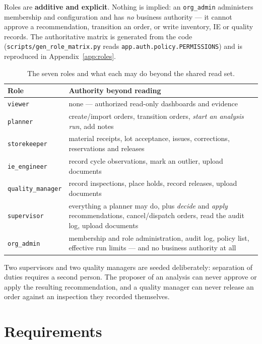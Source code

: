 \documentclass[11pt,a4paper]{article}
\begin{document}
Roles are \textbf{additive and explicit}. Nothing is implied: an
\texttt{org\_admin} administers membership and configuration and has \emph{no}
business authority --- it cannot approve a recommendation, transition an order,
or write inventory, IE or quality records. The authoritative matrix is generated
from the code (\texttt{scripts/gen\_role\_matrix.py} reads
\texttt{app.auth.policy.PERMISSIONS}) and is reproduced in
Appendix~\ref{app:roles}.

\begin{table}[h]
\centering\small
\caption{The seven roles and what each may do beyond the shared read set.}
\begin{tabularx}{\linewidth}{@{}lY@{}}
\toprule
\textbf{Role} & \textbf{Authority beyond reading}\\
\midrule
\texttt{viewer} & none --- authorized read-only dashboards and evidence\\
\texttt{planner} & create/import orders, transition orders, \emph{start an analysis run}, add notes\\
\texttt{storekeeper} & material receipts, lot acceptance, issues, corrections, reservations and releases\\
\texttt{ie\_engineer} & record cycle observations, mark an outlier, upload documents\\
\texttt{quality\_manager} & record inspections, place holds, record releases, upload documents\\
\texttt{supervisor} & everything a planner may do, plus \emph{decide} and \emph{apply} recommendations, cancel/dispatch orders, read the audit log, upload documents\\
\texttt{org\_admin} & membership and role administration, audit log, policy list, effective run limits --- and no business authority at all\\
\bottomrule
\end{tabularx}
\end{table}

Two supervisors and two quality managers are seeded deliberately: separation of
duties requires a second person. The proposer of an analysis can never approve
or apply the resulting recommendation, and a quality manager can never release
an order against an inspection they recorded themselves.

\section{Requirements}
\end{document}
